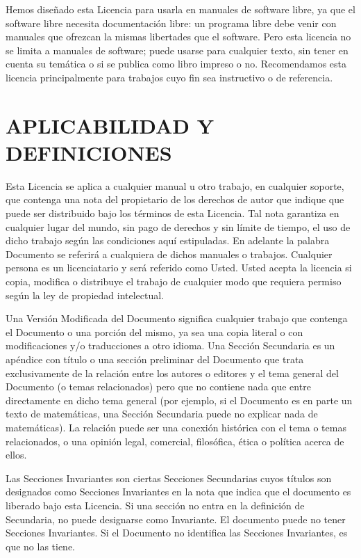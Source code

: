 \documentclass[letterpaper,12pt,titlepage]{article}
\begin{document}
Hemos diseñado esta Licencia para usarla en manuales de software libre, ya que el software libre necesita documentación libre: un programa libre debe venir con manuales que ofrezcan la mismas libertades que el software. Pero esta licencia no se limita a manuales de software; puede usarse para cualquier texto, sin tener en cuenta su temática o si se publica como libro impreso o no. Recomendamos esta licencia principalmente para trabajos cuyo fin sea instructivo o de referencia.\par

\section{APLICABILIDAD Y DEFINICIONES}

Esta Licencia se aplica a cualquier manual u otro trabajo, en cualquier soporte, que contenga una nota del propietario de los derechos de autor que indique que puede ser distribuido bajo los términos de esta Licencia. Tal nota garantiza en cualquier lugar del mundo, sin pago de derechos y sin límite de tiempo, el uso de dicho trabajo según las condiciones aquí estipuladas. En adelante la palabra Documento se referirá a cualquiera de dichos manuales o trabajos. Cualquier persona es un licenciatario y será referido como Usted. Usted acepta la licencia si copia, modifica o distribuye el trabajo de cualquier modo que requiera permiso según la ley de propiedad intelectual.\par

Una Versión Modificada del Documento significa cualquier trabajo que contenga el Documento o una porción del mismo, ya sea una copia literal o con modificaciones y/o traducciones a otro idioma.
Una Sección Secundaria es un apéndice con título o una sección preliminar del Documento que trata exclusivamente de la relación entre los autores o editores y el tema general del Documento (o temas relacionados) pero que no contiene nada que entre directamente en dicho tema general (por ejemplo, si el Documento es en parte un texto de matemáticas, una Sección Secundaria puede no explicar nada de matemáticas). La relación puede ser una conexión histórica con el tema o temas relacionados, o una opinión legal, comercial, filosófica, ética o política acerca de ellos.\par

Las Secciones Invariantes son ciertas Secciones Secundarias cuyos títulos son designados como Secciones Invariantes en la nota que indica que el documento es liberado bajo esta Licencia. Si una sección no entra en la definición de Secundaria, no puede designarse como Invariante. El documento puede no tener Secciones Invariantes. Si el Documento no identifica las Secciones Invariantes, es que no las tiene.\par
\end{document}
